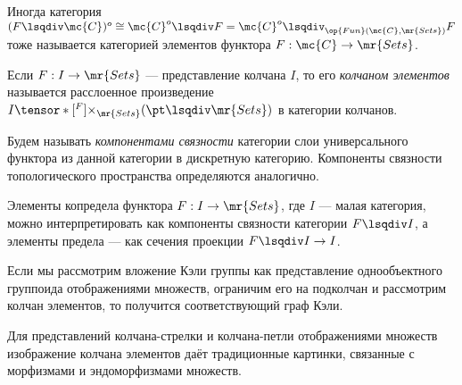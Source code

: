 \documentclass[
	extrafontsizes,
	11pt,
	hyphens,
]{memoir}
\begin{document}
\begin{remark}
Иногда категория
\((F \lsqdiv \mc{C})^o \cong \mc{C}^o \lsqdiv F = \mc{C}^o \lsqdiv_{\op{Fun}(\mc{C},\mr{Sets})} F\)
тоже называется категорией элементов функтора \(F : \mc{C} \to \mr{Sets}\).
\end{remark}

\begin{definition}
Если \(F : I \to \mr{Sets}\) --- представление колчана \(I\), то его \emph{колчаном элементов} называется расслоенное произведение
\(I \tensor*[^F]{\times}{_{\mr{Sets}}} (\pt \lsqdiv \mr{Sets})\)
в категории колчанов.
\end{definition}

\begin{definition}[\scshape Компоненты связности]
Будем называть \emph{компонентами связности} категории слои универсального функтора из данной категории в дискретную категорию.
Компоненты связности топологического пространства определяются аналогично.
\end{definition}

\begin{example}
Элементы копредела функтора \(F: I \to \mr{Sets}\), где \(I\) --- малая категория, можно интерпретировать как компоненты связности категории \(F \lsqdiv I\), а элементы предела --- как сечения проекции \(F \lsqdiv I \to I\).
\end{example}


\begin{example}
Если мы рассмотрим вложение Кэли группы как представление однообъектного группоида отображениями множеств, ограничим его на подколчан и рассмотрим колчан элементов, то получится соответствующий граф Кэли.
\end{example}

\begin{example}
Для представлений колчана-стрелки и колчана-петли отображениями множеств изображение колчана элементов даёт традиционные картинки, связанные с морфизмами и эндоморфизмами множеств.
\end{example}
\end{document}
